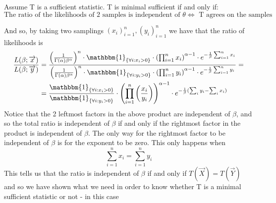 \documentclass[../main.tex]{subfiles}
\begin{document}
\begin{enumerate}
\begin{mdframed}[backgroundcolor=blue!20] 
Assume T is a sufficient statistic. T is minimal sufficient if and only if:
\[\text{The ratio of the likelihoods of 2 samples is independent of }\theta\Longleftrightarrow\text{ T agrees on the samples}\]
\end{mdframed}

And so, by taking two samplings $(x_i)_{i=1}^n, (y_i)_{i=1}^n$ we have that the ratio of likelihoods is 
\begin{align*}
    \frac{L(\beta;\overrightarrow{x})}{L(\beta;\overrightarrow{y})} &= \frac{\left(\frac{1}{\Gamma(\alpha)\beta^{\alpha}}\right)^n\cdot\mathbbm{1}_{\{\forall i:x_i>0\}}\cdot \left(\prod_{i=1}^n x_i\right)^{\alpha-1}\cdot e^{-\frac{1}{\beta} \sum_{i=1}^n x_i}}{\left(\frac{1}{\Gamma(\alpha)\beta^{\alpha}}\right)^n\cdot\mathbbm{1}_{\{\forall i:y_i>0\}}\cdot \left(\prod_{i=1}^n y_i\right)^{\alpha-1}\cdot e^{-\frac{1}{\beta} \sum_{i=1}^n y_i}}= \\ &= \frac{\mathbbm{1}_{\{\forall i:x_i>0\}}}{\mathbbm{1}_{\{\forall i:y_i>0\}}}\cdot \left(\prod_{i=1}^n \left(\frac{x_i}{y_i}\right)\right)^{\alpha-1} \cdot e^{-\frac{1}{\beta}(\sum_i y_i - \sum_i x_i)}
\end{align*}
Notice that the 2 leftmost factors in the above product are independent of $\beta$, and so the total ratio is independent of $\beta$ if and only if the rightmost factor in the product is independent of $\beta$. The only way for the rightmost factor to be independent of $\beta$ is for the exponent to be zero. This only happens when
\[\sum_{i=1}^n x_i = \sum_{i=1}^n y_i\]
This tells us that the ratio is independent of $\beta$ if and only if $T(\overrightarrow{X})=T(\overrightarrow{Y})$ and so we have shown what we need in order to know whether T is a minimal sufficient statistic or not - in this case \,\qedsymbol


\end{enumerate}
\end{document}
